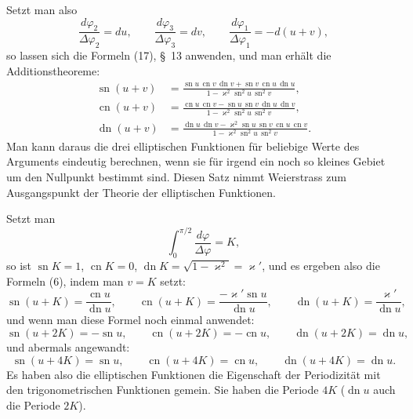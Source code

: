 \documentclass[11pt]{article}
\begin{document}
Setzt man also
\[
\frac{d\varphi_2}{\Delta\varphi_2}=du,\qquad
\frac{d\varphi_3}{\Delta\varphi_3}=dv,\qquad
\frac{d\varphi_1}{\Delta\varphi_1}=-d(u+v),
\]
so lassen sich die Formeln (17), \S~13 anwenden, und man erhält die Additionstheoreme:
\begin{equation}
\begin{aligned}
\operatorname{sn}(u+v)&=
\frac{\operatorname{sn}u\,\operatorname{cn}v\,\operatorname{dn}v+
\operatorname{sn}v\,\operatorname{cn}u\,\operatorname{dn}u}
{1-\varkappa^2\operatorname{sn}^2u\,\operatorname{sn}^2v},\\
\operatorname{cn}(u+v)&=
\frac{\operatorname{cn}u\,\operatorname{cn}v-
\operatorname{sn}u\,\operatorname{sn}v\,\operatorname{dn}u\,\operatorname{dn}v}
{1-\varkappa^2\operatorname{sn}^2u\,\operatorname{sn}^2v},\\
\operatorname{dn}(u+v)&=
\frac{\operatorname{dn}u\,\operatorname{dn}v-
\varkappa^2\operatorname{sn}u\,\operatorname{sn}v\,\operatorname{cn}u\,\operatorname{cn}v}
{1-\varkappa^2\operatorname{sn}^2u\,\operatorname{sn}^2v}.
\end{aligned}
\tag{6}
\end{equation}
Man kann daraus die drei elliptischen Funktionen für beliebige Werte des Arguments eindeutig berechnen, wenn sie für irgend ein noch so kleines Gebiet um den Nullpunkt bestimmt sind. Diesen Satz nimmt Weierstrass zum Ausgangspunkt der Theorie der elliptischen Funktionen.

Setzt man
\[
\int_0^{\pi/2}\frac{d\varphi}{\Delta\varphi}=K,
\]
so ist $\operatorname{sn}K=1$, $\operatorname{cn}K=0$, $\operatorname{dn}K=\sqrt{1-\varkappa^2}=\varkappa'$, und es ergeben also die Formeln (6), indem man $v=K$ setzt:
\begin{equation}
\operatorname{sn}(u+K)=\frac{\operatorname{cn}u}{\operatorname{dn}u},\qquad
\operatorname{cn}(u+K)=\frac{-\varkappa'\operatorname{sn}u}{\operatorname{dn}u},\qquad
\operatorname{dn}(u+K)=\frac{\varkappa'}{\operatorname{dn}u},
\tag{7}
\end{equation}
und wenn man diese Formel noch einmal anwendet:
\begin{equation}
\operatorname{sn}(u+2K)=-\operatorname{sn}u,\qquad
\operatorname{cn}(u+2K)=-\operatorname{cn}u,\qquad
\operatorname{dn}(u+2K)=\operatorname{dn}u,
\tag{8}
\end{equation}
und abermals angewandt:
\begin{equation}
\operatorname{sn}(u+4K)=\operatorname{sn}u,\qquad
\operatorname{cn}(u+4K)=\operatorname{cn}u,\qquad
\operatorname{dn}(u+4K)=\operatorname{dn}u.
\tag{9}
\end{equation}
Es haben also die elliptischen Funktionen die Eigenschaft der Periodizität mit den trigonometrischen Funktionen gemein. Sie haben die Periode $4K$ ($\operatorname{dn}u$ auch die Periode $2K$).
\end{document}
